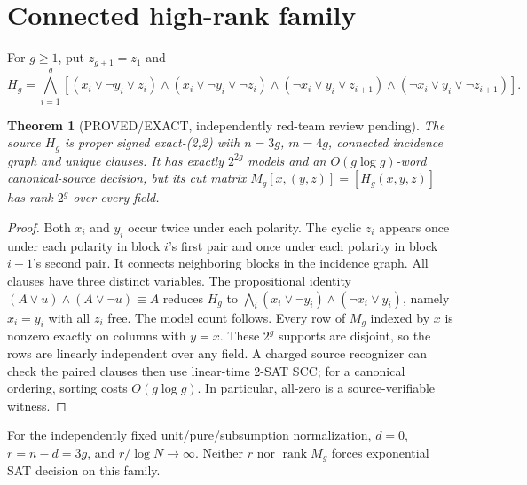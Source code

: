 \documentclass[11pt]{article}
\newtheorem{theorem}{Theorem}
\begin{document}
\section{Connected high-rank family}
For $g\ge1$, put $z_{g+1}=z_1$ and
\[
H_g=\bigwedge_{i=1}^{g}\left[
(x_i\vee\neg y_i\vee z_i)
\land(x_i\vee\neg y_i\vee\neg z_i)
\land(\neg x_i\vee y_i\vee z_{i+1})
\land(\neg x_i\vee y_i\vee\neg z_{i+1})\right].
\]
\begin{theorem}[PROVED/EXACT, independently red-team review pending]
The source $H_g$ is proper signed exact-(2,2) with $n=3g$, $m=4g$, connected incidence graph and unique clauses. It has exactly $2^{2g}$ models and an $O(g\log g)$-word canonical-source decision, but its cut matrix $M_g[x,(y,z)]=[H_g(x,y,z)]$ has rank $2^g$ over every field.
\end{theorem}
\begin{proof}
Both $x_i$ and $y_i$ occur twice under each polarity. The cyclic $z_i$ appears once under each polarity in block $i$'s first pair and once under each polarity in block $i-1$'s second pair. It connects neighboring blocks in the incidence graph. All clauses have three distinct variables. The propositional identity
$(A\vee u)\land(A\vee\neg u)\equiv A$
reduces $H_g$ to
$\bigwedge_i(x_i\vee\neg y_i)\land(\neg x_i\vee y_i)$, namely $x_i=y_i$ with all $z_i$ free. The model count follows. Every row of $M_g$ indexed by $x$ is nonzero exactly on columns with $y=x$. These $2^g$ supports are disjoint, so the rows are linearly independent over any field. A charged source recognizer can check the paired clauses then use linear-time 2-SAT SCC; for a canonical ordering, sorting costs $O(g\log g)$. In particular, all-zero is a source-verifiable witness.
\end{proof}
For the independently fixed unit/pure/subsumption normalization, $d=0$, $r=n-d=3g$, and $r/\log N\to\infty$. Neither $r$ nor $\operatorname{rank}M_g$ forces exponential SAT decision on this family.
\end{document}
